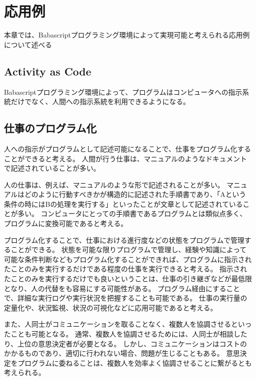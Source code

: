 \chapter{応用例}\label{chap:application}

本章では、Babascriptプログラミング環境によって実現可能と考えられる応用例について述べる

\section{Activity as Code}\label{activity-as-code}

Babascriptプログラミング環境によって、プログラムはコンピュータへの指示系統だけでなく、人間への指示系統を利用できるようになる。

\section{仕事のプログラム化}\label{ux4ed5ux4e8bux306eux30d7ux30edux30b0ux30e9ux30e0ux5316}

人への指示がプログラムとして記述可能になることで、仕事をプログラム化することができると考える。
人間が行う仕事は、マニュアルのようなドキュメントで記述されていることが多い。

人の仕事は、例えば、マニュアルのような形で記述されることが多い。
マニュアルはどのように行動すべきかが構造的に記述された手順書であり、「Aという条件の時にはBの処理を実行する」といったことが文章として記述されていることが多い。
コンピュータにとっての手順書であるプログラムとは類似点多く、プログラムに変換可能であると考える。

プログラム化することで、仕事における進行度などの状態をプログラムで管理することができる。
状態を可能な限りプログラムで管理し、経験や知識によって可能な条件判断などもプログラム化することができれば、プログラムに指示されたことのみを実行するだけである程度の仕事を実行できると考える。
指示されたことのみを実行するだけでも良いということは、仕事の引き継ぎなどが最低限となり、人の代替をも容易にする可能性がある。
プログラム経由にすることで、詳細な実行ログや実行状況を把握することも可能である。
仕事の実行量の定量化や、状況監視、状況の可視化などに応用可能であると考える。

また、人同士がコミュニケーションを取ることなく、複数人を協調させるといったことも可能となる。
通常、複数人を協調させるためには、人同士が相談したり、上位の意思決定者が必要となる。
しかし、コミュニケーションはコストのかかるものであり、適切に行われない場合、問題が生じることもある。
意思決定をプログラムに委ねることは、複数人を効率よく協調させることに繋がるとも考えられる。

